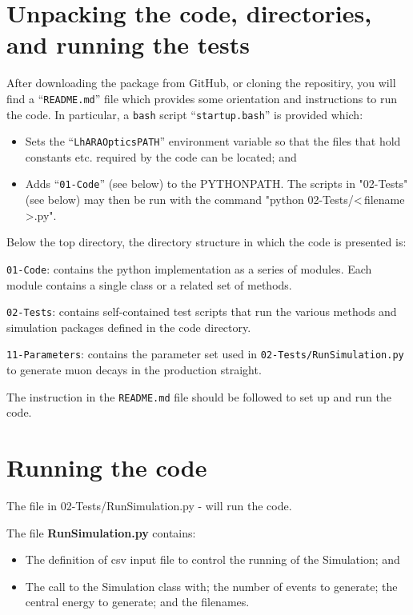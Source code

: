 \section*{Unpacking the code, directories, and running the tests}
After downloading the package from GitHub, or cloning the repositiry,
you will find a ``\verb+README.md+'' file which provides some orientation
and instructions to run the code.
In particular, a \verb+bash+ script ``\verb+startup.bash+'' is
provided which:
\begin{itemize}
  \item Sets the ``\verb+LhARAOpticsPATH+'' environment variable
    so that the files that hold constants etc. required by the code
    can be located; and
  \item Adds ``\verb+01-Code+'' (see below) to the PYTHONPATH.
    The scripts in "02-Tests" (see below) may then be run with the
    command "python 02-Tests/\textless\,filename\,\textgreater.py".
\end{itemize}
Below the top directory, the directory structure in which the code is
presented is:
\begin{description}
  \item\verb+01-Code+: contains the python implementation as a
    series of modules.
    Each module contains a single class or a related set of methods.
  \item\verb+02-Tests+: contains self-contained test scripts that
    run the various methods and simulation packages defined in the
    code directory.
  \item\verb+11-Parameters+: contains the parameter set used in
    \verb+02-Tests/RunSimulation.py+ to generate muon decays in
    the production straight.
\end{description}
The instruction in the \verb+README.md+ file should be followed to set
up and run the code.

\section*{Running the code}
The file in 02-Tests/RunSimulation.py - will run the code.

\noindent The file {\bf RunSimulation.py} contains:
\begin{itemize}
  \item The definition of csv  input file to control the running of
    the Simulation; and
  \item The call to the Simulation class with; the number of events to
    generate; the central energy to generate; and the
    filenames.
\end{itemize}
